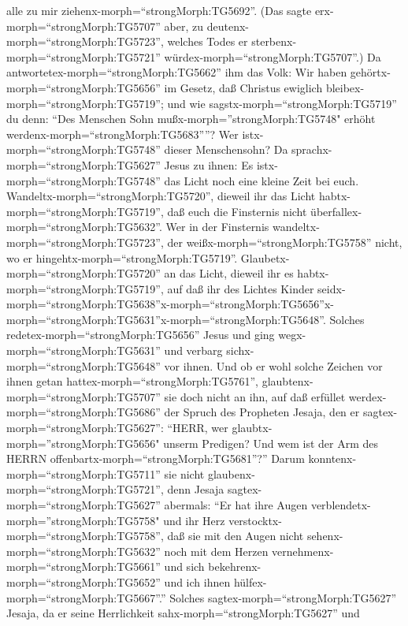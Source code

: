 alle zu mir ziehenx-morph=``strongMorph:TG5692''.  (Das
sagte erx-morph=``strongMorph:TG5707'' aber, zu
deutenx-morph=``strongMorph:TG5723'', welches Todes er
sterbenx-morph=``strongMorph:TG5721''
würdex-morph=``strongMorph:TG5707''.)  Da
antwortetex-morph=``strongMorph:TG5662'' ihm das Volk: Wir haben
gehörtx-morph=``strongMorph:TG5656'' im Gesetz, daß Christus ewiglich
bleibex-morph=``strongMorph:TG5719''; und wie
sagstx-morph=``strongMorph:TG5719'' du denn: ``Des Menschen Sohn
mußx-morph=''strongMorph:TG5748" erhöht
werdenx-morph=``strongMorph:TG5683''''? Wer
istx-morph=``strongMorph:TG5748'' dieser Menschensohn?  Da
sprachx-morph=``strongMorph:TG5627'' Jesus zu ihnen: Es
istx-morph=``strongMorph:TG5748'' das Licht noch eine kleine Zeit bei
euch. Wandeltx-morph=``strongMorph:TG5720'', dieweil ihr das Licht
habtx-morph=``strongMorph:TG5719'', daß euch die Finsternis nicht
überfallex-morph=``strongMorph:TG5632''. Wer in der Finsternis
wandeltx-morph=``strongMorph:TG5723'', der
weißx-morph=``strongMorph:TG5758'' nicht, wo er
hingehtx-morph=``strongMorph:TG5719''. 
Glaubetx-morph=``strongMorph:TG5720'' an das Licht, dieweil ihr es
habtx-morph=``strongMorph:TG5719'', auf daß ihr des Lichtes Kinder
seidx-morph=``strongMorph:TG5638''x-morph=``strongMorph:TG5656''x-morph=``strongMorph:TG5631''x-morph=``strongMorph:TG5648''.
 Solches redetex-morph=``strongMorph:TG5656'' Jesus und
ging wegx-morph=``strongMorph:TG5631'' und verbarg
sichx-morph=``strongMorph:TG5648'' vor ihnen. Und ob er wohl solche
Zeichen vor ihnen getan hattex-morph=``strongMorph:TG5761'',
glaubtenx-morph=``strongMorph:TG5707'' sie doch nicht an ihn,
 auf daß erfüllet werdex-morph=``strongMorph:TG5686'' der
Spruch des Propheten Jesaja, den er sagtex-morph=``strongMorph:TG5627'':
``HERR, wer glaubtx-morph=''strongMorph:TG5656" unserm Predigen? Und wem
ist der Arm des HERRN offenbartx-morph=``strongMorph:TG5681''?''
 Darum konntenx-morph=``strongMorph:TG5711'' sie nicht
glaubenx-morph=``strongMorph:TG5721'', denn Jesaja
sagtex-morph=``strongMorph:TG5627'' abermals:  ``Er hat
ihre Augen verblendetx-morph=''strongMorph:TG5758" und ihr Herz
verstocktx-morph=``strongMorph:TG5758'', daß sie mit den Augen nicht
sehenx-morph=``strongMorph:TG5632'' noch mit dem Herzen
vernehmenx-morph=``strongMorph:TG5661'' und sich
bekehrenx-morph=``strongMorph:TG5652'' und ich ihnen
hülfex-morph=``strongMorph:TG5667''.''  Solches
sagtex-morph=``strongMorph:TG5627'' Jesaja, da er seine Herrlichkeit
sahx-morph=``strongMorph:TG5627'' und
